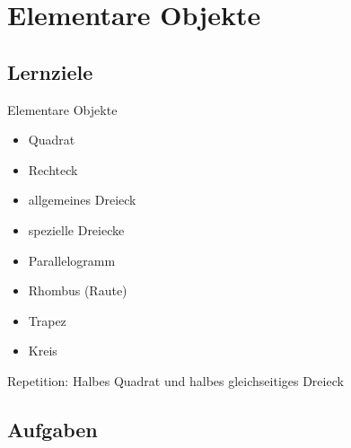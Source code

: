 
\section{Elementare Objekte}




\subsection*{Lernziele}
Elementare Objekte
\begin{itemize}
  \item Quadrat
  \item Rechteck
  \item allgemeines Dreieck
  \item spezielle Dreiecke
  \item Parallelogramm
  \item Rhombus (Raute)
  \item Trapez
  \item Kreis
\end{itemize}

Repetition: Halbes Quadrat und halbes gleichseitiges Dreieck

\subsection*{Aufgaben}

\newpage
